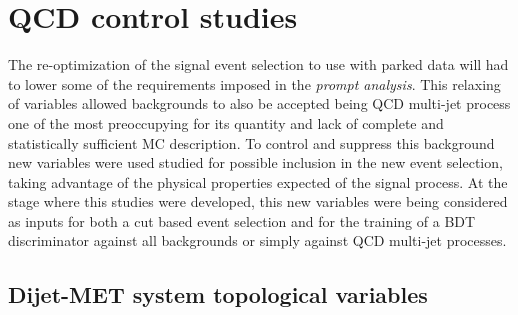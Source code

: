 \clearpage

\section{QCD control studies}


The re-optimization of the signal event selection to use with parked data will had to lower some of the requirements imposed in the \textit{prompt analysis}. This relaxing of variables allowed backgrounds to also be accepted being \gls{QCD} multi-jet process one of the most preoccupying for its quantity and lack of complete and statistically sufficient \gls{MC} description. To control and suppress this  background new variables were used studied for possible inclusion in the new event selection, taking advantage of the physical properties expected of the signal process. At the stage where this studies were developed, this new variables were being considered as inputs for both a cut based event selection and for the training of a \gls{BDT} discriminator against all backgrounds or simply against \gls{QCD} multi-jet processes.

\subsection{Dijet-MET system topological variables}
\label{SECTION:PreparationParkedDataAnalysis_DijetMETSystemVars}
% 
% 
% 
% 
%
%

